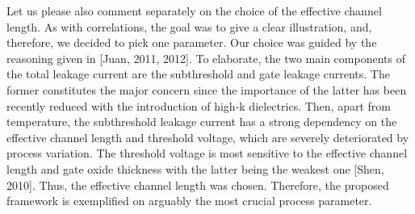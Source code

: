\begin{authors}
Let us please also comment separately on the choice of the effective channel length.
As with correlations, the goal was to give a clear illustration, and, therefore, we decided to pick one parameter.
Our choice was guided by the reasoning given in [Juan, 2011, 2012].
To elaborate, the two main components of the total leakage current are the subthreshold and gate leakage currents.
The former constitutes the major concern since the importance of the latter has been recently reduced with the introduction of high-k dielectrics.
Then, apart from temperature, the subthreshold leakage current has a strong dependency on the effective channel length and threshold voltage, which are severely deteriorated by process variation.
The threshold voltage is most sensitive to the effective channel length and gate oxide thickness with the latter being the weakest one [Shen, 2010].
Thus, the effective channel length was chosen.
Therefore, the proposed framework is exemplified on arguably the most crucial process parameter.

\end{authors}

